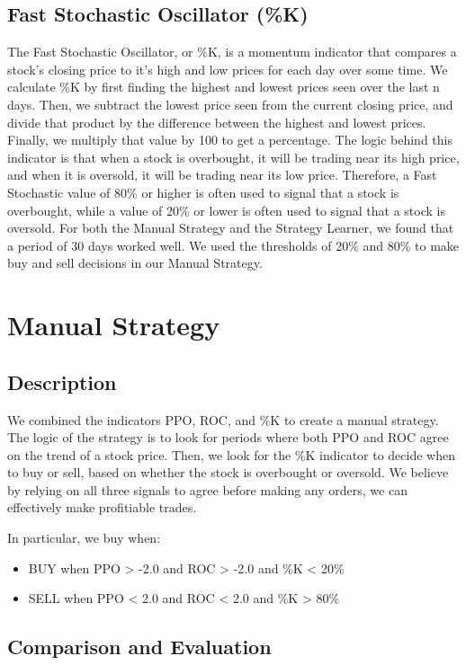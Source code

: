 \documentclass[
	letterpaper, %
]{jdf}
\begin{document}
\subsection{Fast Stochastic Oscillator (\%K)}
The Fast Stochastic Oscillator, or \%K, is a momentum indicator that compares a stock's closing price to it's high and low prices for each day over some time.
We calculate \%K by first finding the highest and lowest prices seen over the last n days.
Then, we subtract the lowest price seen from the current closing price, and divide that product by the difference between the highest and lowest prices.
Finally, we multiply that value by 100 to get a percentage.
The logic behind this indicator is that when a stock is overbought, it will be trading near its high price, and when it is oversold, it will be trading near its low price.
Therefore, a Fast Stochastic value of 80\% or higher is often used to signal that a stock is overbought, while a value of 20\% or lower is often used to signal that a stock is oversold.
For both the Manual Strategy and the Strategy Learner, we found that a period of 30 days worked well.
We used the thresholds of 20\% and 80\% to make buy and sell decisions in our Manual Strategy.

\section{Manual Strategy}
\subsection{Description}
We combined the indicators PPO, ROC, and \%K to create a manual strategy.
The logic of the strategy is to look for periods where both PPO and ROC agree on the trend of a stock price.
Then, we look for the \%K indicator to decide when to buy or sell, based on whether the stock is overbought or oversold.
We believe by relying on all three signals to agree before making any orders, we can effectively make profitiable trades.

In particular, we buy when:
\begin{itemize}
	\item BUY when PPO > -2.0 and ROC > -2.0 and \%K < 20\%
	\item SELL when PPO < 2.0 and ROC < 2.0 and \%K > 80\%
\end{itemize}

\subsection{Comparison and Evaluation}
\end{document}
